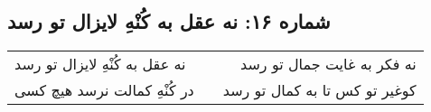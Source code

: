 \begin{center}
\section*{شماره ۱۶: نه عقل به کُنْهِ لایزال تو رسد}
\label{sec:016}
\begin{longtable}{l p{0.5cm} r}
نه عقل به کُنْهِ لایزال تو رسد
&&
نه فکر به غایت جمال تو رسد
\\
در کُنْهِ کمالت نرسد هیچ کسی
&&
کوغیر تو کس تا به کمال تو رسد
\\
\end{longtable}
\end{center}
